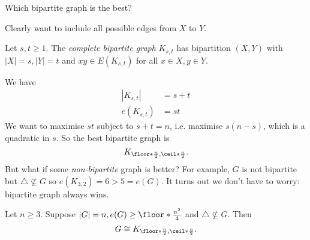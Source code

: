 \documentclass[a4paper]{article}
\begin{document}
\begin{question}
  Which bipartite graph is the best?
\end{question}

Clearly want to include all possible edges from \(X\) to \(Y\).

\begin{definition}
  Let \(s,t\geq 1\). The \emph{complete bipartite graph} \(K_{s,t}\) has bipartition \((X,Y)\) with \(|X| = s, |Y| = t\) and \(xy \in E(K_{s,t})\) for all \(x\in X, y\in Y\).
\end{definition}

We have
\begin{align*}
  |K_{s,t}| &= s+t \\
  e(K_{s,t}) &= st
\end{align*}
We want to maximise \(st\) subject to \(s+t=n\), i.e. maximise \(s(n-s)\), which is a quadratic in \(s\). So the best bipartite graph is
\[
  K_{\floor*{\frac{n}{2}}, \ceil*{\frac{n}{2}}}.
\]
But what if some \emph{non-bipartite} graph is better? For example, \(G\) is not bipartite but \(\triangle \nsubseteq G\) so \(e(K_{3,2}) = 6 > 5 = e(G)\). It turns out we don't have to worry: bipartite graph always wins.

\begin{theorem}
  Let \(n\geq 3\). Suppose \(|G| = n, e(G) \geq \floor*{\frac{n^2}{4}}\) and \(\triangle \nsubseteq G\). Then
  \[
    G \cong K_{\floor*{\frac{n}{2}}, \ceil*{\frac{n}{2}}}.
  \]
\end{theorem}
\end{document}
